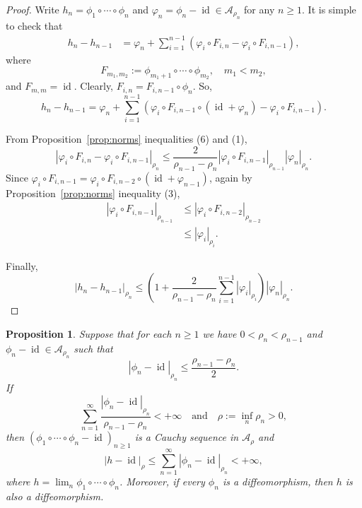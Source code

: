 \documentclass[12pt,reqno,a4paper]{amsart}%
\numberwithin{equation}{section}
\newtheorem{proposition}[theorem]{Proposition}
\newcommand{\A}{{\mathcal A}}
\newcommand{\id}  {\operatorname{id}}
\begin{document}
\begin{proof}
Write $h_n=\phi_1\circ\cdots\circ \phi_{n}$ and $\varphi_n=\phi_n-\id \in\A_{\rho_n}$ for any $n\geq1$.
It is simple to check that
\begin{equation*}
\begin{split}
h_{n}-h_{n-1}
&=
\varphi_{n} + 
\sum_{i=1}^{n-1}\left(
\varphi_i\circ F_{i,n}
-\varphi_i\circ F_{i,n-1}
\right),
\end{split}
\end{equation*}
where 
$$
F_{m_1,m_2}:=\phi_{m_1+1}\circ\cdots\circ \phi_{m_2},\quad m_1< m_2,
$$
and $F_{m,m}=\id$.
Clearly, $F_{i,n}=F_{i,n-1}\circ \phi_n$.
So,
$$
h_{n}-h_{n-1}=
\varphi_{n} + 
\sum_{i=1}^{n-1}\left(
\varphi_i\circ F_{i,n-1}\circ(\id+\varphi_n)
-\varphi_i\circ F_{i,n-1}
\right).
$$

From Proposition~\ref{prop:norms} inequalities (6) and (1), 
$$
|\varphi_i\circ F_{i,n}-\varphi_i\circ F_{i,{n-1}}|_{\rho_n}
\leq 
\frac{2}{\rho_{n-1}-\rho_n}
|\varphi_i\circ F_{i,n-1}|_{\rho_{n-1}}
|\varphi_{n}|_{\rho_n}.
$$
Since $\varphi_i\circ F_{i,n-1}=\varphi_i\circ F_{i,n-2}\circ(\id+\varphi_{n-1})$,
again by Proposition~\ref{prop:norms} inequality (3),
\begin{equation*}
\begin{split}
|\varphi_i\circ F_{i,n-1}|_{\rho_{n-1}}
&\leq 
|\varphi_i\circ F_{i,n-2}|_{\rho_{n-2}} \\
&\leq
|\varphi_i|_{\rho_{i}}.
\end{split}
\end{equation*}

Finally,
$$
|h_{n}-h_{n-1}|_{\rho_n}
\leq
\left(1+ 
\frac{2}{\rho_{n-1}-\rho_n}
\sum_{i=1}^{n-1}
|\varphi_i|_{\rho_i}
\right)
 |\varphi_{n}|_{\rho_n}.
$$
\end{proof}


\begin{proposition}\label{prop: conv of Hn}
Suppose that for each $n\geq1$ we have $0<\rho_{n}<\rho_{n-1}$ and $\phi_n-\id\in\A_{\rho_n}$ such that
$$
|\phi_n-\id|_{\rho_n}
\leq \frac{\rho_{n-1}-\rho_n}{2}.
$$
If
$$
\sum_{n=1}^\infty \frac{|\phi_n-\id|_{\rho_n}}{\rho_{n-1}-\rho_{n}}<+\infty\quad\text{and}\quad \rho:=\inf_n \rho_n>0,
$$
then  $(\phi_1\circ\cdots\circ \phi_n-\id)_{n\geq1}$ is a Cauchy sequence in $\A_{\rho}$ and
$$
|h-\id|_\rho \leq \sum_{n=1}^{\infty}
|\phi_n-\id|_{\rho_n}<+\infty,
$$
where $h=\lim_n \phi_1\circ\cdots\circ \phi_n$.
Moreover, if every $\phi_n$ is a diffeomorphism, then  $h$ is also a diffeomorphism.
\end{proposition}
\end{document}
